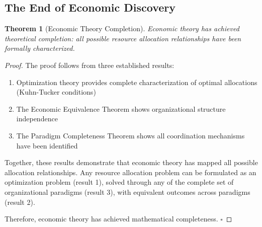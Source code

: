 \documentclass[12pt,a4paper]{article}
\newtheorem{theorem}{Theorem}
\begin{document}
\subsection{The End of Economic Discovery}

\begin{theorem}[Economic Theory Completion]
Economic theory has achieved theoretical completion: all possible resource allocation relationships have been formally characterized.
\end{theorem}

\begin{proof}
The proof follows from three established results:
\begin{enumerate}
\item Optimization theory provides complete characterization of optimal allocations (Kuhn-Tucker conditions) \cite{samuelson1947}
\item The Economic Equivalence Theorem shows organizational structure independence
\item The Paradigm Completeness Theorem shows all coordination mechanisms have been identified
\end{enumerate}

Together, these results demonstrate that economic theory has mapped all possible allocation relationships. Any resource allocation problem can be formulated as an optimization problem (result 1), solved through any of the complete set of organizational paradigms (result 3), with equivalent outcomes across paradigms (result 2).

Therefore, economic theory has achieved mathematical completeness. $\square$
\end{proof}
\end{document}

